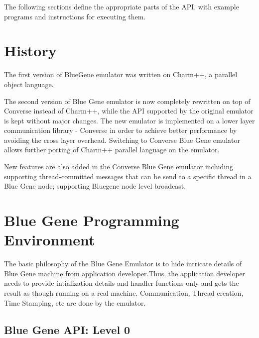 \documentclass[10pt]{article}
\begin{document}
The following sections define the appropriate parts of the API, with
example programs and instructions for executing them.

\section{History}

The first version of BlueGene emulator was written on Charm++, a 
parallel object language. 

The second version of Blue Gene emulator is now 
completely rewritten on top of Converse instead of Charm++, while the API 
supported by the original emulator is kept without major changes. The new 
emulator is implemented on a lower layer communication library - Converse 
in order to achieve better performance by avoiding the cross layer overhead. 
Switching to Converse Blue Gene emulator allows further porting of Charm++ 
parallel language on the emulator. 

New features are also added in the Converse Blue Gene emulator including 
supporting thread-committed messages that can be send to a specific thread 
in a Blue Gene node; supporting Bluegene node level broadcast. 

\section{Blue Gene Programming Environment}

The basic philosophy of the Blue Gene Emulator is to hide intricate details
of Blue Gene machine from
application developer.Thus, the application developer needs to provide
intialization details and handler
functions only and gets the result as though running on a real machine.
Communication, Thread creation,
Time Stamping, etc are done by the emulator.

\subsection{Blue Gene API: Level 0}

\end{document}
